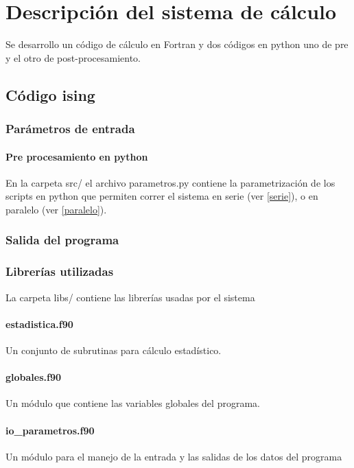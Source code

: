 
\section{Descripci\'on del sistema de c\'alculo}


Se desarrollo un c\'odigo de c\'alculo en Fortran y dos c\'odigos
en python uno  de pre y el otro de post-procesamiento.


\subsection{C\'odigo ising}

\subsubsection{Par\'ametros de entrada}



\paragraph{Pre procesamiento en python}
En la carpeta src/ el archivo parametros.py contiene la parametrizaci\'on 
de los scripts
en python que permiten correr el sistema en serie (ver \ref{serie}), 
o en paralelo (ver \ref{paralelo}).


\subsubsection{Salida del programa}

\subsubsection{Librer\'ias utilizadas}

La carpeta libs/ contiene las librer\'ias usadas por el sistema

\paragraph{estadistica.f90}

Un conjunto de subrutinas para c\'alculo estad\'istico. 

\paragraph{globales.f90}
Un m\'odulo que contiene las variables globales del programa.
	
\paragraph{io\_parametros.f90}  
Un m\'odulo para el manejo de la entrada y las salidas de los
datos del programa


